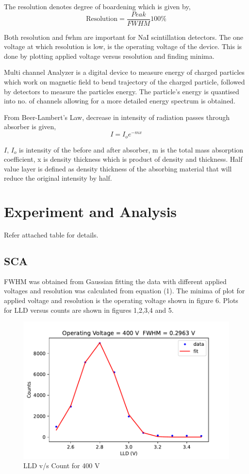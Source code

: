 \documentclass[a4paper, amsfonts, amssymb, amsmath, reprint, showkeys, nofootinbib, twoside]{revtex4-1}
\begin{document}
The resolution denotes degree of boardening which is given by,
\begin{equation}
	\text{Resolution}=\frac{Peak}{FWHM}100\%
\end{equation}

Both resolution and fwhm are important for NaI scintillation detectors. The one voltage at which resolution is low, is the operating voltage of the device. This is done by plotting applied voltage versus resolution and finding minima.

Multi channel Analyzer is a digital device to measure energy of charged particles which work on magnetic field to bend trajectory of the charged particle, followed by detectors to measure the particles energy. The particle's energy is quantised into no. of channels allowing for a more detailed energy spectrum is obtained. 

From Beer-Lambert's Law, decrease in intensity of radiation passes through absorber is given,
\begin{equation}
	I=I_oe^{-mx}
\end{equation}

$I$, $I_o$ is intensity of the before and after absorber, m is the total mass absorption coefficient, x is density thickness which is product of density and thickness. Half value layer is defined as density thickness of the absorbing material that will reduce the original intensity by half. 

\section{Experiment and Analysis}
Refer attached table for details.

\subsection{SCA}
FWHM was obtained from Gaussian fitting the data with different applied voltages and resolution was calculated from equation (1). The minima of plot for applied voltage and resolution is the operating voltage shown in figure 6. Plots for LLD versus counts are shown in figures 1,2,3,4 and 5. 

\begin{figure}[H]
	\centering
	\includegraphics[scale=0.6]{1}
	\caption{LLD v/s Count for 400 V}
\end{figure}
\end{document}
